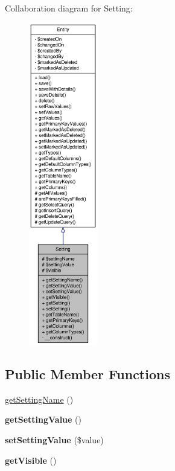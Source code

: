 Collaboration diagram for Setting:\nopagebreak
\begin{figure}[H]
\begin{center}
\leavevmode
\includegraphics[height=400pt]{classSetting__coll__graph}
\end{center}
\end{figure}
\subsection*{Public Member Functions}
\begin{DoxyCompactItemize}
\item 
\hyperlink{classSetting_afc1e17b405d06caab9faf3362d3522b4}{getSettingName} ()
\item 
\hypertarget{classSetting_aa98eb86325da3d3e4c98f007eda9c7ae}{
{\bfseries getSettingValue} ()}
\label{classSetting_aa98eb86325da3d3e4c98f007eda9c7ae}

\item 
\hypertarget{classSetting_a8714591d5d8722109dffff3edf449fee}{
{\bfseries setSettingValue} (\$value)}
\label{classSetting_a8714591d5d8722109dffff3edf449fee}

\item 
\hypertarget{classSetting_a171a5479082b748b6eb3bfc3d8d8f864}{
{\bfseries getVisible} ()}
\label{classSetting_a171a5479082b748b6eb3bfc3d8d8f864}

\end{DoxyCompactItemize}
